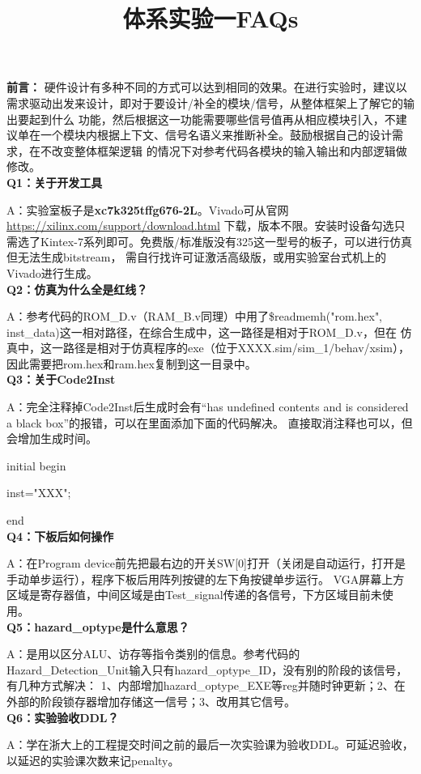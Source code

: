 \documentclass{article}
\title{\textbf{体系实验一FAQs}\vspace{-2em}}
\author{}
\date{}
\begin{document}
\maketitle

\textbf{前言：}
硬件设计有多种不同的方式可以达到相同的效果。在进行实验时，建议以需求驱动出发来设计，即对于要设计/补全的模块/信号，从整体框架上了解它的输出要起到什么
功能，然后根据这一功能需要哪些信号值再从相应模块引入，不建议单在一个模块内根据上下文、信号名语义来推断补全。鼓励根据自己的设计需求，在不改变整体框架逻辑
的情况下对参考代码各模块的输入输出和内部逻辑做修改。\\


\textbf{Q1：关于开发工具}

A：实验室板子是\textbf{xc7k325tffg676-2L}。Vivado可从官网
\href{https://xilinx.com/support/download.html}{https://xilinx.com/support/download.html}
下载，版本不限。安装时设备勾选只需选了Kintex-7系列即可。免费版/标准版没有325这一型号的板子，可以进行仿真但无法生成bitstream，
需自行找许可证激活高级版，或用实验室台式机上的Vivado进行生成。\\


\textbf{Q2：仿真为什么全是红线？}

A：参考代码的ROM\_D.v（RAM\_B.v同理）中用了\$readmemh("rom.hex", inst\_data)这一相对路径，在综合生成中，这一路径是相对于ROM\_D.v，但在
仿真中，这一路径是相对于仿真程序的exe（位于XXXX.sim/sim\_1/behav/xsim），因此需要把rom.hex和ram.hex复制到这一目录中。\\


\textbf{Q3：关于Code2Inst}

A：完全注释掉Code2Inst后生成时会有“has undefined contents and is considered a black box”的报错，可以在里面添加下面的代码解决。
直接取消注释也可以，但会增加生成时间。

initial begin

\indent\indent inst="XXX";

end\\


\textbf{Q4：下板后如何操作}

A：在Program device前先把最右边的开关SW[0]打开（关闭是自动运行，打开是手动单步运行），程序下板后用阵列按键的左下角按键单步运行。
VGA屏幕上方区域是寄存器值，中间区域是由Test\_signal传递的各信号，下方区域目前未使用。\\


\textbf{Q5：hazard\_optype是什么意思？}

A：是用以区分ALU、访存等指令类别的信息。参考代码的Hazard\_Detection\_Unit输入只有hazard\_optype\_ID，没有别的阶段的该信号，有几种方式解决：
1、内部增加hazard\_optype\_EXE等reg并随时钟更新；2、在外部的阶段锁存器增加存储这一信号；3、改用其它信号。\\



\textbf{Q6：实验验收DDL？}

A：学在浙大上的工程提交时间之前的最后一次实验课为验收DDL。可延迟验收，以延迟的实验课次数来记penalty。
\end{document}
